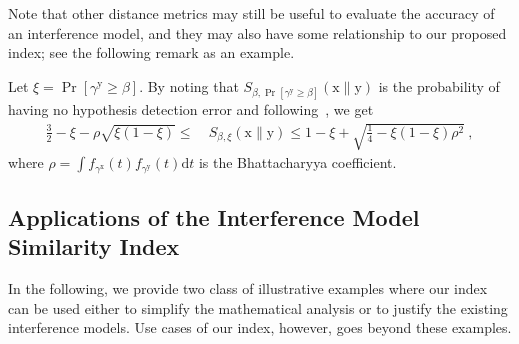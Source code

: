 \documentclass[12pt, draftclsnofoot, onecolumn]{IEEEtran}
\begin{document}
Note that other distance metrics may still be useful to evaluate the accuracy of an interference model, and they may also have some relationship to our proposed index; see the following remark as an example.
\begin{remark}\label{remark: Bhattacharyya-distance}
Let $\xi = \Pr \left[\gamma^{\mathrm{y}} \geq \beta \right]$. By noting that $S_{\beta,\Pr \left[\gamma^{\mathrm{y}} \geq \beta \right]}\left(\mathrm{x}\|\mathrm{y} \right)$ is the probability of having no hypothesis detection error and following~\cite[Equation~(48)]{Kailath1967Bhattacharyya}, we get
\begin{align}\label{eq: ComparisonWithBhattacharyya}
\frac{3}{2} - \xi - \rho \sqrt{\xi \left(1-\xi\right)} \leq &~ S_{\beta,\xi}\left(\mathrm{x}\|\mathrm{y} \right)\leq 1 - \xi + \sqrt{\frac{1}{4} - \xi \left(1-\xi\right) \rho^2} \:,
\end{align}
where $\rho = \int{f_{\gamma^{\mathrm{x}}}(t)f_{\gamma^{\mathrm{y}}}(t)\mathrm{d}t}$ is the Bhattacharyya coefficient.
\end{remark}

\subsection{Applications of the Interference Model Similarity Index}\label{sec: set-of-interf}
In the following, we provide two class of illustrative examples where our index can be used either to simplify the mathematical analysis or to justify the existing interference models. Use cases of our index, however, goes beyond these examples.
\end{document}
